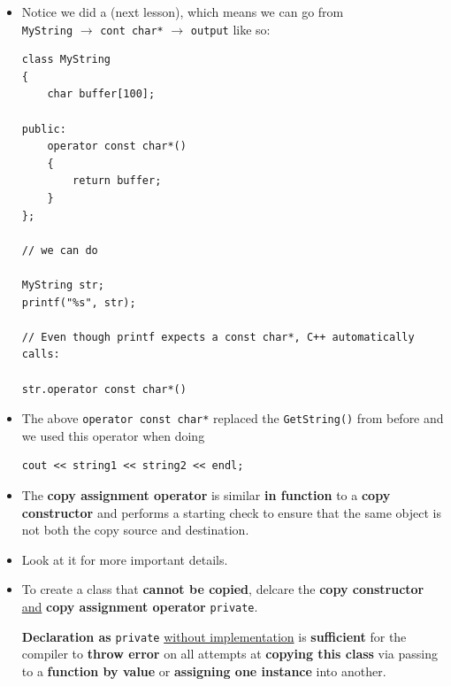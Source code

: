 \documentclass[10pt]{article}
\newcommand{\pbreak}{\vspace{30pt}}
\newcommand{\vocab}[1]{\fbox{\textbf{\textit{#1}}}}
\begin{document}
\begin{itemize}
	\newpage

\item Notice we did a \vocab{type conversion} (next lesson), which means we can go from\\
\verb|MyString| $\rightarrow$ \verb|cont char*| $\rightarrow$ \verb|output| like so:

\begin{verbatim}
class MyString
{
    char buffer[100];

public:
    operator const char*()
    {
        return buffer;
    }
};

// we can do

MyString str;
printf("%s", str);

// Even though printf expects a const char*, C++ automatically calls:

str.operator const char*()
\end{verbatim}

\item The above \verb|operator const char*| replaced the \verb|GetString()| from before and we used this operator when doing
	\begin{verbatim}
cout << string1 << string2 << endl;
	\end{verbatim}

\pbreak

\item The \textbf{copy assignment operator} is similar \textbf{in function} to a \textbf{copy constructor} and performs a starting check to ensure that the same object is not both the copy source and destination.

\item Look at it for more important details.

\end{itemize}
	\begin{tcolorbox}
		\begin{itemize}
			\item To create a class that \textbf{cannot be copied}, delcare the \textbf{copy constructor} \underline{and} \textbf{copy assignment operator} \verb|private|.

			\textbf{Declaration as } \verb|private| \underline{without implementation} is \textbf{sufficient} for the compiler to \textbf{throw error} on all attempts at \textbf{copying this class} via passing to a \textbf{function by value} or \textbf{assigning one instance} into another.
		\end{itemize}
	\end{tcolorbox}
\end{document}
